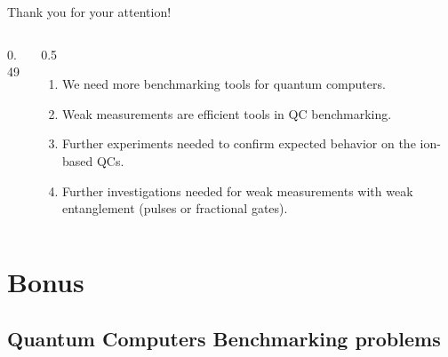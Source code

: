 \documentclass{beamer}
\begin{document}
\begin{frame}{Thank you for your attention!}
\begin{columns}
\begin{column}{0.49\linewidth}
\begin{block}
					
					
				\end{block}
				
				\vspace{1cm}
				
			\end{column} 
			
			\begin{column}{0.5\textwidth}
				\begin{enumerate}
					
					\item We need more benchmarking tools for quantum computers.
					
					\item Weak measurements are efficient tools in QC benchmarking.
					
					\item Further experiments needed to confirm expected behavior on the ion-based QCs. 
					
					\item Further investigations needed for weak measurements with weak entanglement (pulses or fractional gates).
					
				\end{enumerate}
				
				\vspace{2cm}
				
			\end{column}
		
		\end{columns}
	
	\end{frame}

\section{Bonus}
\subsection{Quantum Computers Benchmarking problems}
\end{document}
